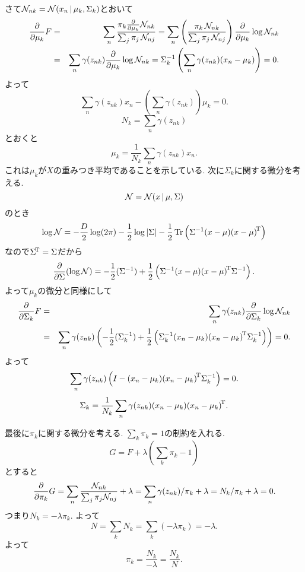 さて${\cal N}_{nk}={\cal N}(x_n\,|\,\mu_k,\Sigma_k)$とおいて
\begin{eqnarray*}
\frac{\partial}{\partial \mu_k}F
 &=& \sum_n \frac{\pi_k \frac{\partial}{\partial \mu_k}{\cal N}_{nk}}{\sum_j \pi_j\,{\cal N}_{nj}}
 = \sum_n \left(\frac{\pi_k\,{\cal N}_{nk}}{\sum_j \pi_j\,{\cal N}_{nj}}\right)\frac{\partial}{\partial \mu_k}\log {\cal N}_{nk} \\
 &=& \sum_n \gamma(z_{nk}) \frac{\partial}{\partial \mu_k}\log {\cal N}_{nk}
 = \Sigma_k^{-1}\left(\sum_n \gamma(z_{nk})(x_n-\mu_k)\right)=0.
\end{eqnarray*}
よって
$$
\sum_n \gamma(z_{nk})x_n - \left(\sum_n \gamma(z_{nk})\right)\mu_k=0.
$$
$$
N_k=\sum_n \gamma(z_{nk})
$$
とおくと
$$
\mu_k=\frac{1}{N_k}\sum_n \gamma(z_{nk})x_n.
$$
これは$\mu_k$が$X$の重みつき平均であることを示している.
次に$\Sigma_k$に関する微分を考える.
$$
{\cal N} = {\cal N}(x\,|\,\mu,\Sigma)
$$
のとき
$$
\log {\cal N} = -\frac{D}{2}\log(2\pi)-\frac{1}{2}\log |\Sigma| - \frac{1}{2}\mathop{\mathrm{Tr}}\nolimits\left(\Sigma^{-1}(x-\mu){(x-\mu)}^{\!\mathrm{T}}\right)
$$
なので${\Sigma}^{\!\mathrm{T}}=\Sigma$だから
$$
\frac{\partial}{\partial \Sigma} (\log {\cal N})
= -\frac{1}{2}(\Sigma^{-1})
  +\frac{1}{2}\left(\Sigma^{-1}(x-\mu){(x-\mu)}^{\!\mathrm{T}}\Sigma^{-1}\right).
$$
よって$\mu_k$の微分と同様にして
\begin{eqnarray*}
\frac{\partial}{\partial \Sigma_k}F
 &=& \sum_n \gamma(z_{nk}) \frac{\partial}{\partial \Sigma_k} \log {\cal N}_{nk}\\
 &=&\sum_n \gamma(z_{nk})\left(-\frac{1}{2}(\Sigma_k^{-1})
        + \frac{1}{2}\left(\Sigma_k^{-1}(x_n-\mu_k){(x_n-\mu_k)}^{\!\mathrm{T}}\Sigma_k^{-1}\right)\right) = 0.
\end{eqnarray*}
よって
$$
\sum_n \gamma(z_{nk})\left(I-(x_n-\mu_k){(x_n-\mu_k)}^{\!\mathrm{T}}\Sigma_k^{-1}\right)=0.
$$
$$
\Sigma_k=\frac{1}{N_k}\sum_n \gamma(z_{nk})(x_n-\mu_k){(x_n-\mu_k)}^{\!\mathrm{T}}.
$$

最後に$\pi_k$に関する微分を考える.
$\sum_k \pi_k=1$の制約を入れる.
$$
G=F+\lambda\left(\sum_k \pi_k-1\right)
$$
とすると
$$
\frac{\partial}{\partial \pi_k}{G}
=\sum_n \frac{{\cal N}_{nk}}{\sum_j \pi_j{\cal N}_{nj}}+\lambda=\sum_n \gamma(z_{nk})/\pi_k+\lambda=N_k/\pi_k+\lambda=0.
$$
つまり$N_k = -\lambda \pi_k$.
よって
$$
N=\sum_k N_k=\sum_k (-\lambda \pi_k) = -\lambda.
$$
よって
$$
\pi_k=\frac{N_k}{-\lambda}=\frac{N_k}{N}.
$$
\vspace{0pt}

